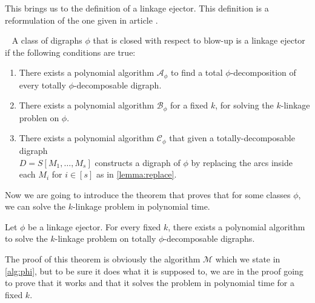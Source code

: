 This brings us to the definition of a linkage ejector. This definition is a reformulation of the one given in article \cite{bangJGT85}.
\begin{definition}~\cite{bangJGT85}
    A class of digraphs $\phi$ that is closed with respect to blow-up is a linkage ejector if the following conditions are true:
    \begin{enumerate}
        \item There exists a polynomial algorithm $\mathcal{A}_{\phi}$ to find a total $\phi$-decomposition of every totally $\phi$-decomposable digraph.
        \item There exists a polynomial algorithm $\mathcal{B}_{\phi}$ for a fixed $k$, for solving the $k$-linkage problen on $\phi$.
        \item There exists a polynomial algorithm $\mathcal{C}_{\phi}$ that given a totally-decomposable digraph \\
        $D=S[M_1,\dots , M_s]$ constructs a digraph of $\phi$ by replacing the arcs inside each $M_i$ for $i\in [s]$ as in \autoref{lemma:replace}. 
    \end{enumerate}
    \label{def:ejector}
\end{definition}
Now we are going to introduce the theorem that proves that for some classes $\phi$, we can solve the $k$-linkage problem in polynomial time.
\begin{thm}
    Let $\phi$ be a linkage ejector. For every fixed $k$, there exists a polynomial algorithm to solve the $k$-linkage problem on totally $\phi$-decomposable digraphs. 
    \label{thm:philinked}
\end{thm}
The proof of this theorem is obviously the algorithm $\mathcal{M}$ which we state in \autoref{alg:phi}, but to be sure it does what it is supposed to, we are in the proof going to prove that it works and that it solves the problem in polynomial time for a fixed $k$. 
